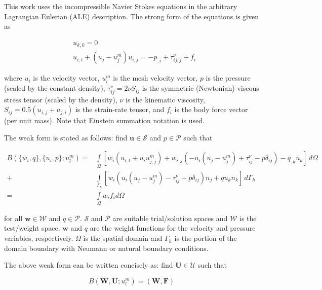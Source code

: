 This work uses the incompressible Navier Stokes equations in the arbitrary Lagrangian Eulerian (ALE) description.
The strong form of the equations is given as

\begin{equation}
\label{eq:NS_strong}
\begin{split}
  &u_{k,k} = 0\\
  &u_{i,t} + (u_j - u^m_j) u_{i,j}  =  - p_{,i} + \tau^{\nu}_{ij,j}  + f_i 
\end{split}
\end{equation}

\noindent where $u_i$ is the velocity vector,
$u^m_i$ is the mesh velocity vector,
$p$ is the pressure (scaled by the constant density),
$\tau^{\nu}_{ij}=2 \nu S_{ij}$ is the symmetric (Newtonian) viscous stress
tensor (scaled by the density), $\nu$ is the kinematic viscosity, 
$S_{ij}=0.5(u_{i,j} + u_{j,i})$ is the strain-rate tensor,
and $f_i$ is the body force vector (per unit mass).
Note that Einstein summation notation is used.

The weak form is stated as follows:
find $\mathbf{u} \in \bm{\mathcal{S}}$ and $p \in \mathcal{P}$ such that

\begin{equation}
\label{eq:NS_weak}
\begin{split}
B(\{w_i,q\}, \{u_i,p\};u^m_l) =& \int\limits_\Omega [w_i (u_{i,t} + u_i u^m_{j,j}) + w_{i,j} (-u_i (u_j - u^m_j) + \tau^{\nu}_{ij} - p \delta_{ij}) -q_{,k} u_k] \, d\Omega \\
      +& \int\limits_{\Gamma_h} [w_i (u_i(u_j-u^m_j)  - \tau^{\nu}_{ij} + p \delta_{ij}) n_j + q u_k n_k] \, d\Gamma_h \\
	  =& \int\limits_\Omega w_i f_i d\Omega
\end{split}
\end{equation}

\noindent for all $\mathbf{w} \in \bm{\mathcal{W}}$ and $q \in \mathcal{P}$.
$\bm{\mathcal{S}}$ and $\mathcal{P}$ are suitable trial/solution spaces
and $\bm{\mathcal{W}}$ is the test/weight space.
$\mathbf{w}$ and $q$ are the weight
functions for the velocity and pressure variables, respectively.
$\Omega$ is the spatial domain and $\Gamma_h$ is the portion of the domain
boundary with Neumann or natural boundary conditions.

The above weak form can be written concisely as:
find $\bm{U} \in \bm{\mathcal{U}}$ such that 

\begin{equation}
\label{eq:NS_weak2}
B(\bm{W},\bm{U};u^m_l) = (\bm{W},\bm{F})
\end{equation}

